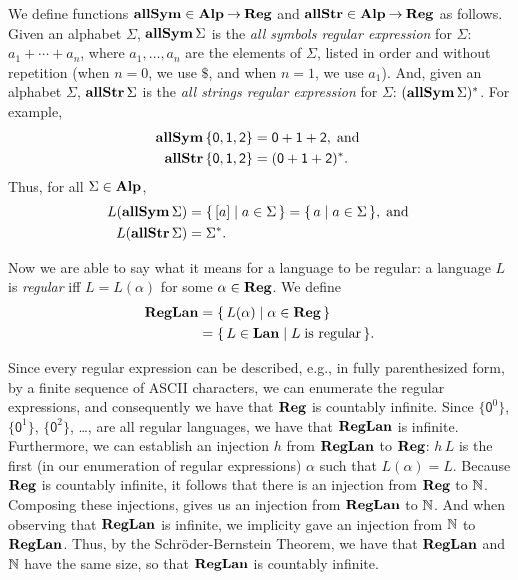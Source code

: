 We define functions $\mathbf{allSym}\in\mathbf{Alp}\mathbin{\to}\mathbf{Reg}$ and $\mathbf{allStr}\in
\mathbf{Alp}\mathbin{\to}\mathbf{Reg}$ as follows.  Given an alphabet $\Sigma$, $\mathbf{allSym}\,\Sigma$
is the \emph{all symbols regular expression} for $\Sigma$:
$a_1+\cdots+a_n$, where $a_1,\ldots,a_n$
  are the elements of $\Sigma$, listed in order and without repetition
  (when $n=0$, we use $\$$, and when $n=1$, we use $a_1$).
And, given an alphabet $\Sigma$, $\mathbf{allStr}\,\Sigma$ is
the \emph{all strings regular expression} for $\Sigma$:
$(\mathbf{allSym}\,\Sigma)^*$.
For example, 
\begin{align*}
\mathbf{allSym}\,\{\mathsf{0,1,2}\} &= \mathsf{0 + 1 + 2} , \;\allowbreak\mbox{and}\allowbreak\; \\
\mathbf{allStr}\,\{\mathsf{0,1,2}\} &= (\mathsf{0 + 1 + 2})^* .
\end{align*}
Thus, for all $\Sigma\in\mathbf{Alp}$,
\begin{align*}
L(\mathbf{allSym}\,\Sigma) &= \{ \, [a] \mid a\in\Sigma \, \} = \{ \, a \mid a\in\Sigma \, \},
\;\allowbreak\mbox{and}\allowbreak\; \\
L(\mathbf{allStr}\,\Sigma) &= \Sigma^* .
\end{align*}

%
%
Now we are able to say what it means for a language to be regular:
a language $L$ is \emph{regular} iff $L=L(\alpha)$ for some
$\alpha\in\mathbf{Reg}$.  We define
%
%
\begin{align*}
\mathbf{RegLan} &= \{ \, L(\alpha) \mid \alpha\in\mathbf{Reg} \, \} \\
&= \{ \, L\in\mathbf{Lan} \mid L\;\allowbreak\mbox{is regular}\allowbreak \, \} .
\end{align*}

Since every regular expression can be described, e.g., in fully
parenthesized form, by a finite sequence of ASCII characters, we can
enumerate the regular expressions, and consequently we have that
$\mathbf{Reg}$ is countably infinite.  Since $\{\mathsf{0}^0\}$,
$\{\mathsf{0}^1\}$, $\{\mathsf{0}^2\}$, \ldots, are all regular
languages, we have that $\mathbf{RegLan}$ is infinite.  Furthermore, we can
establish an injection $h$ from $\mathbf{RegLan}$ to $\mathbf{Reg}$: $h\,L$ is the
first (in our enumeration of regular expressions) $\alpha$ such that
$L(\alpha)=L$.  Because $\mathbf{Reg}$ is countably infinite, it follows that
there is an injection from $\mathbf{Reg}$ to $\mathbb{N}$.  Composing these
injections, gives us an injection from $\mathbf{RegLan}$ to $\mathbb{N}$.  And when
observing that $\mathbf{RegLan}$ is infinite, we implicity gave an injection
from $\mathbb{N}$ to $\mathbf{RegLan}$. Thus, by the Schr\"oder-Bernstein Theorem,
we have that $\mathbf{RegLan}$ and $\mathbb{N}$ have the same size, so that
$\mathbf{RegLan}$ is countably infinite.

